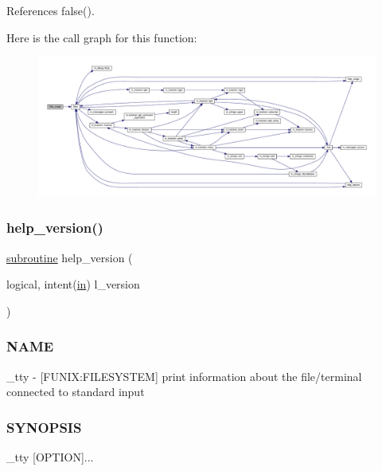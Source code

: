 References false().

Here is the call graph for this function\+:
\nopagebreak
\begin{figure}[H]
\begin{center}
\leavevmode
\includegraphics[width=350pt]{__tty_8f90_a3e09a3b52ee8fb04eeb93fe5761626a8_cgraph}
\end{center}
\end{figure}
\mbox{\label{__tty_8f90_a39c21619b08a3c22f19e2306efd7f766}} 
\subsubsection{\texorpdfstring{help\+\_\+version()}{help\_version()}}
{\footnotesize\ttfamily \hyperlink{M__stopwatch_83_8txt_acfbcff50169d691ff02d4a123ed70482}{subroutine} help\+\_\+version (\begin{DoxyParamCaption}\item[{logical, intent(\hyperlink{M__journal_83_8txt_afce72651d1eed785a2132bee863b2f38}{in})}]{l\+\_\+version }\end{DoxyParamCaption})}



\subsubsection*{N\+A\+ME}

\+\_\+tty -\/ \mbox{[}F\+U\+N\+IX\+:F\+I\+L\+E\+S\+Y\+S\+T\+EM\mbox{]} print information about the file/terminal connected to standard input 

\subsubsection*{S\+Y\+N\+O\+P\+S\+IS}

\begin{DoxyVerb}    _tty [OPTION]...
\end{DoxyVerb}
